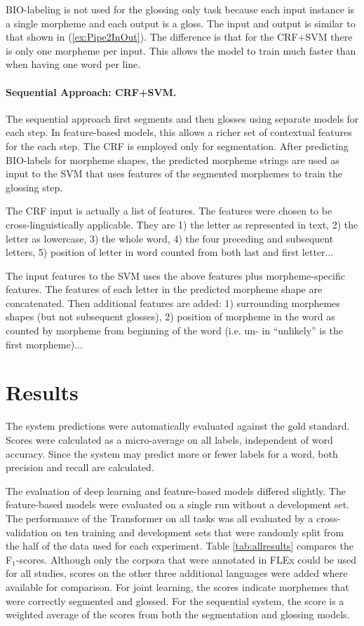 BIO-labeling is not used for the glossing only task because each input instance is a single morpheme and each output is a gloss. The input and output is similar to that shown in (\ref{ex:Pipe2InOut}). The difference is that for the CRF+SVM there is only one morpheme per input. This allows the model to train much faster than when having one word per line.

\paragraph{Sequential Approach: CRF+SVM.}
The sequential approach first segments and then glosses using separate models for each step. In feature-based models, this allows a richer set of contextual features for the each step. 
The CRF is employed only for segmentation. After predicting BIO-labels for morpheme shapes, the predicted morpheme strings are used as input to the SVM that uses features of the segmented morphemes to train the glossing step. 

The CRF input is actually a list of features. The features were chosen to be cross-linguistically applicable. They are 1) the letter as represented in text, 2) the letter as lowercase, 3) the whole word, 4) the four preceding and subsequent letters, 5) position of letter in word counted from both last and first letter...

The input features to the SVM uses the above features plus morpheme-specific features. The features of each letter in the predicted morpheme shape are concatenated. Then additional features are added: 1) surrounding morphemes shapes (but not subsequent glosses), 2) position of morpheme in the word as counted by morpheme from beginning of the word (i.e. un- in ``unlikely'' is the first morpheme)...

\section{Results}
\label{sec:results}

The system predictions were automatically evaluated against the gold standard. Scores were calculated as a micro-average on all labels, independent of word accuracy. Since the system may predict more or fewer labels for a word, both precision and recall are calculated. 

The evaluation of deep learning and feature-based models differed slightly. The feature-based models were evaluated on a single run without a development set. The performance of the Transformer on all tasks was all evaluated by a cross-validation on ten training and development sets that were randomly split from the half of the data used for each experiment. Table \ref{tab:allresults} compares the F$_1$-scores. Although only the corpora that were annotated in FLEx could be used for all studies, scores on the other three additional languages were added where available for comparison.
For joint learning, the scores indicate morphemes that were correctly segmented and glossed. For the sequential system, the score is a weighted average of the scores from both the segmentation and glossing models. 

